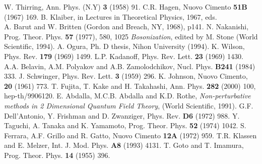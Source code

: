 \documentclass[a4paper,fleqn]{article}
\begin{document}
\newpage
\begin{thebibliography}{99}
 W. Thirring, Ann. Phys. (N.Y) {\bf 3} (1958) 91.
\vspace{-3mm}
 C.R. Hagen, Nuovo Cimento {\bf 51B} (1967) 169.
\vspace{-3mm}
 B. Klaiber, in Lectures in Theoretical Physics, 1967, eds. \\%
 A. Barut and W. Britten (Gordon and Breach, NY, 1968), p141.
\vspace{-3mm}
 N. Nakanishi, Prog. Theor. Phys. {\bf 57} (1977), 580, 1025
\vspace{-3mm}
{\it Bosonization}, edited by M. Stone (World Scientific, 1994).
\vspace{-3mm}
 A. Ogura, Ph. D thesis, Nihon University (1994).
\vspace{-3mm}
 K. Wilson, Phys. Rev. {\bf 179} (1969) 1499.
\vspace{-3mm}
 L.P. Kadanoff, Phys. Rev. Lett. {\bf 23} (1969) 1430.
\vspace{-3mm}
 A.A. Belavin, A.M. Polyakov and A.B. Zamolodchikov, 
 Nucl. Phys. {\bf B241} (1984) 333.
\vspace{-3mm}
 J. Schwinger, Phys. Rev. Lett. {\bf 3} (1959) 296.
\vspace{-3mm}
 K. Johnson, Nuovo Cimento, {\bf 20} (1961) 773.
\vspace{-3mm}
 T. Fujita, T. Kake and H. Takahashi, Ann. Phys.  {\bf 282} (2000) 100,
 \\hep-th/9906120.
\vspace{-3mm}
E. Abdalla, M.C.B. Abdalla and K.D. Rothe,
{\it {\small Non-perturbative methods in} 
 2 Dimensional Quantum Field Theory}, (World Scientific, 1991).
\vspace{-3mm}
 G.F. Dell'Antonio, Y. Frishman and D. Zwanziger, Phys. Rev. {\bf D6} (1972) 988.
\vspace{-3mm}
 Y. Taguchi, A. Tanaka and K. Yamamoto, Prog. Theor. Phys. {\bf 52} (1974) 1042.
\vspace{-3mm}
 S. Ferrara, A.F. Grillo and R. Gatto, Nuovo Cimento {\bf 12A} (1972) 959.
\vspace{-3mm}
T.R. Klassen and E. Melzer, Int. J. Mod. Phys. {\bf A8} (1993)  4131.
\vspace{-3mm}
 T. Goto and T. Imamura, Prog. Theor. Phys. {\bf 14} (1955) 396.
\end{thebibliography}
\end{document}
